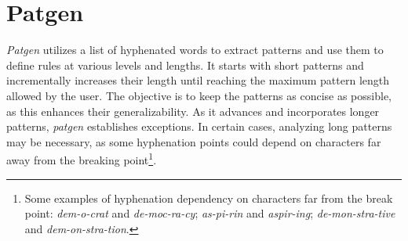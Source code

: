 \section{Patgen}\label{sec-patgen} 

\emph{Patgen} utilizes a list of hyphenated words to extract patterns and use them to define rules at various levels and lengths.
It starts with short
patterns and incrementally increases their length until reaching the maximum
pattern length allowed by the user.  The objective is to keep the patterns as
concise as possible, as this enhances their generalizability.  As it advances
and incorporates longer patterns, \emph{patgen} establishes exceptions.  In certain
cases, analyzing long patterns may be necessary, as some hyphenation points
could depend on characters far away from the breaking point\footnote{Some
    examples of hyphenation dependency on characters far from the break point:
    \emph{dem-o-crat} and \emph{de-moc-ra-cy}; \emph{as-pi-rin} and
    \emph{aspir-ing}; \emph{de-mon-stra-tive} and \emph{dem-on-stra-tion}.
}.



